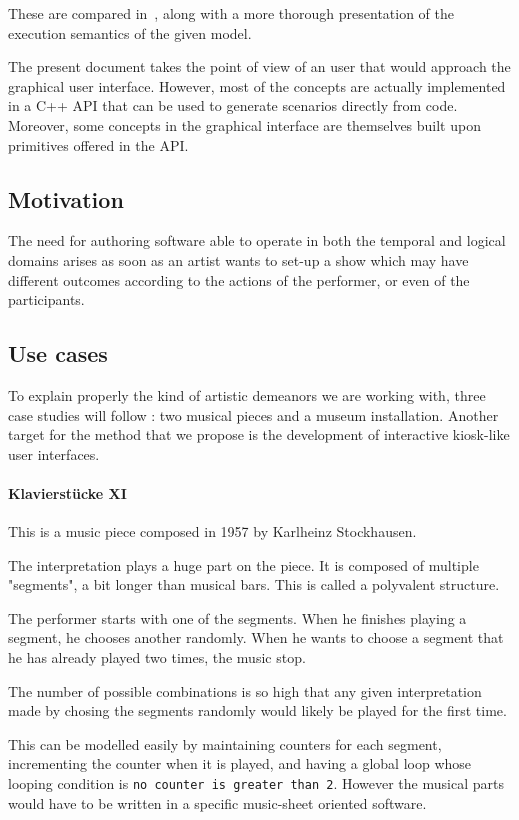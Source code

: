 \documentclass{sigchi}
\begin{document}
These are compared in~\cite{celerier2015ossia}, along with a more thorough presentation of the execution semantics of the given model.

The present document takes the point of view of an user that would approach the graphical user interface. However, most of the concepts are actually implemented in a C++ API\cite{hogue2014ossia} that can be used to generate scenarios directly from code. Moreover, some concepts in the graphical interface are themselves built upon primitives offered in the API.

\subsection{Motivation}
The need for authoring software able to operate in both the temporal and logical domains arises as soon as an artist wants to set-up a show which may have different outcomes according to the actions of the performer, or even of the participants.

\subsection{Use cases}
To explain properly the kind of artistic demeanors we are working with, three case studies will follow : two musical pieces and a museum installation. Another target for the method that we propose is the development of interactive kiosk-like user interfaces.

\paragraph{Klavierstücke XI}
This is a music piece composed in 1957 by Karlheinz Stockhausen.

The interpretation plays a huge part on the piece. It is composed of multiple "segments", a bit longer than musical bars. This is called a polyvalent structure.

The performer starts with one of the segments. When he finishes playing a segment, he chooses another randomly. When he wants to choose a segment that he has already played two times, the music stop.

The number of possible combinations is so high that any given interpretation made by chosing the segments randomly would likely be played for the first time.

This can be modelled easily by maintaining counters for each segment, incrementing the counter when it is played, and having a global loop whose looping condition is \texttt{no counter is greater than 2}. However the musical parts would have to be written in a specific music-sheet oriented software.
\end{document}
